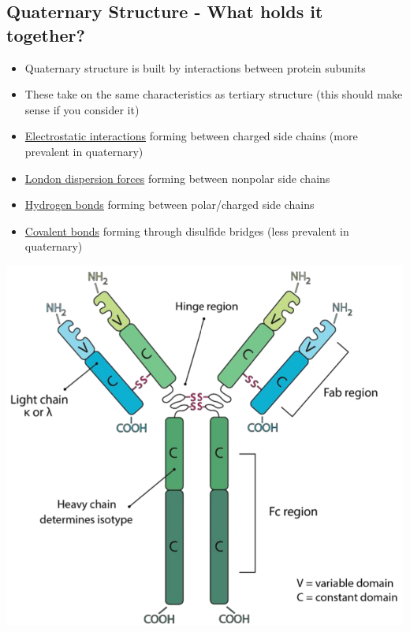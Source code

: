 \documentclass[10pt]{article}
\begin{document}
\subsection*{Quaternary Structure - What holds it together?}
\begin{itemize}
    \item Quaternary structure is built by interactions between protein subunits
    \item These take on the same characteristics as tertiary structure (this should make sense if you consider it)
    \item \underline{Electrostatic interactions} forming between charged side chains (more prevalent in quaternary)
    \item \underline{London dispersion forces} forming between nonpolar side chains
    \item \underline{Hydrogen bonds} forming between polar/charged side chains
    \item \underline{Covalent bonds} forming through disulfide bridges (less prevalent in quaternary)
\end{itemize}
\begin{center}
    \includegraphics*[scale=0.6]{L1_11.png}
\end{center}
\end{document}
